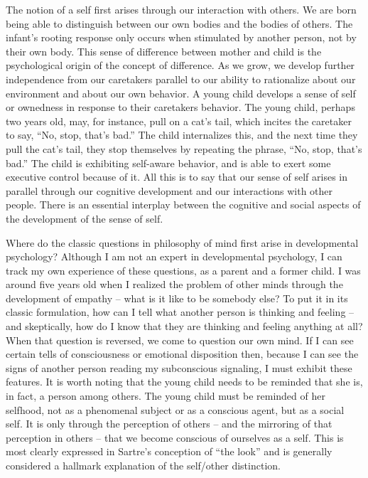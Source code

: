 \documentclass[leqno]{article}
\begin{document}
	The notion of a self first arises through our interaction with others. We are
	born being able to distinguish between our own bodies and the bodies of others.
	The infant’s rooting response only occurs when stimulated by another person,
	not by their own body. This sense of difference between mother and child is the
	psychological origin of the concept of difference. As we grow, we develop further
	independence from our caretakers parallel to our ability to rationalize about our
	environment and about our own behavior. A young child develops a sense of self
	or ownedness in response to their caretakers behavior. The young child,
	perhaps two years old, may, for instance, pull on a cat’s tail, which incites
	the caretaker to say, “No, stop, that’s bad.” The child internalizes this, and
	the next time they pull the cat’s tail, they stop themselves by repeating the phrase,
	“No, stop, that’s bad.” The child is exhibiting self-aware behavior, and is able
	to exert some executive control because of it. All this is to say that our
	sense of self arises in parallel through our cognitive development and our
	interactions with other people. There is an essential interplay between the cognitive
	and social aspects of the development of the sense of self.

	Where do the classic questions in philosophy of mind first arise in developmental
	psychology? Although I am not an expert in developmental psychology, I can track
	my own experience of these questions, as a parent and a former child. I was around
	five years old when I realized the problem of other minds through the development
	of empathy – what is it like to be somebody else? To put it in its classic
	formulation, how can I tell what another person is thinking and feeling – and skeptically,
	how do I know that they are thinking and feeling anything at all? When that question
	is reversed, we come to question our own mind. If I can see certain tells of consciousness
	or emotional disposition then, because I can see the signs of another person
	reading my subconscious signaling, I must exhibit these features. It is worth
	noting that the young child needs to be reminded that she is, in fact, a
	person among others. The young child must be reminded of her selfhood, not as
	a phenomenal subject or as a conscious agent, but as a social self. It is only
	through the perception of others – and the mirroring of that perception in
	others – that we become conscious of ourselves as a self. This is most clearly
	expressed in Sartre’s conception of “the look” and is generally considered a hallmark
	explanation of the self/other distinction.
\end{document}
